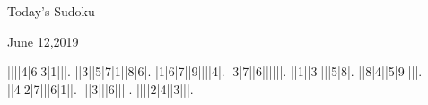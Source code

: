 \documentclass{article}
\begin{document}
\begin{center}
\Huge{Today's Sudoku}
\end{center}
\begin{center}
\Large{June 12,2019}
\end{center}
\begin{sudoku}
||||4|6|3|1|||.
||3||5|7|1||8|6|.
|1|6|7||9||||4|.
|3|7||6||||||.
||1||3||||5|8|.
||8|4||5|9||||.
||4|2|7|||6|1||.
|||3|||6||||.
||||2|4||3|||.
\end{sudoku}
\end{document}
